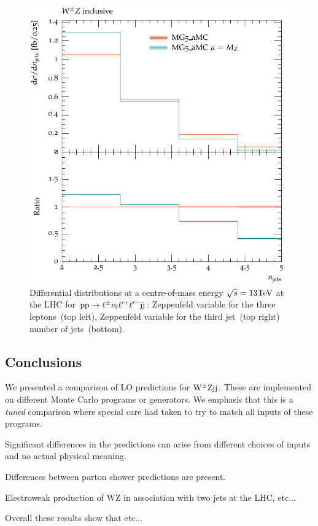 \documentclass[11pt]{cernrep}
\begin{document}
\begin{figure}[htbp]
\begin{center}
   \includegraphics[scale=0.5]{figs/MG_nJets}
\caption{Differential distributions at a centre-of-mass energy $\sqrt{s}=13{\rm TeV}$ at the LHC for ${\rm p} {\rm p} \to \ell^\pm  \nu_{\ell}  \ell^{\prime +} \ell^{\prime -} {\rm j} {\rm j}$: 
                Zeppenfeld variable for the three leptons~(top left),
                Zeppenfeld variable for the third jet~(top right)
                number of jets~(bottom).}
\label{vbs_fig_shower_3b}
\end{center}
\end{figure}

\subsection{Conclusions \label{concl}}

We presented a comparison of LO predictions for ${\rm W}^{\pm}{\rm Z}{\rm j}{\rm j}$.
These are implemented on different Monte Carlo programs or generators.
We emphasis that this is a \emph{tuned} comparison where special care had taken to try to match all inputs of these programs.

Significant differences in the predictions can arise from different choices of inputs and no actual physical meaning.

Differences between parton shower predictions are present.

Electroweak production of WZ in association with two jets at the LHC, etc... 

Overall these results show that etc...


\end{document}
